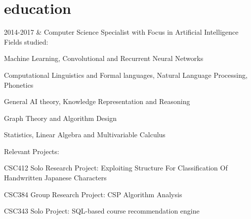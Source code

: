 \documentclass[]{cv-roald}
\begin{document}
\section*{education}
\begin{tabularcv}
    2014-2017   &   
                    \newline Computer Science Specialist with Focus in Artificial Intelligence
                    \newline Fields studied:
                    \begin{tabitemize}
                        \item Machine Learning, Convolutional and Recurrent Neural Networks
                        \item Computational Linguistics and Formal languages, Natural Language Processing, Phonetics
                        \item General AI theory, Knowledge Representation and Reasoning 
                        \item Graph Theory and Algorithm Design
                        \item Statistics, Linear Algebra and Multivariable Calculus\newline
                    \end{tabitemize}
                    Relevant Projects:
                    \begin{tabitemize}
                        \item CSC412 Solo Research Project: Exploiting Structure For Classification Of Handwritten Japanese Characters
                        \item CSC384 Group Research Project: CSP Algorithm Analysis
                        \item CSC343 Solo Project: SQL-based course recommendation engine
                    \end{tabitemize}
                    \\[\vspacepar] %
                    

\end{tabularcv}
\end{document}
